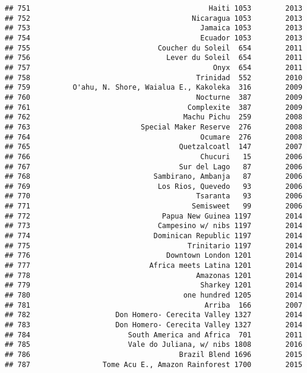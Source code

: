 \documentclass[
]{article}
\begin{document}
\begin{verbatim}
## 751                                          Haiti 1053        2013
## 752                                      Nicaragua 1053        2013
## 753                                        Jamaica 1053        2013
## 754                                        Ecuador 1053        2013
## 755                              Coucher du Soleil  654        2011
## 756                                Lever du Soleil  654        2011
## 757                                           Onyx  654        2011
## 758                                       Trinidad  552        2010
## 759          O'ahu, N. Shore, Waialua E., Kakoleka  316        2009
## 760                                       Nocturne  387        2009
## 761                                     Complexite  387        2009
## 762                                    Machu Pichu  259        2008
## 763                          Special Maker Reserve  276        2008
## 764                                        Ocumare  276        2008
## 765                                   Quetzalcoatl  147        2007
## 766                                        Chucuri   15        2006
## 767                                   Sur del Lago   87        2006
## 768                             Sambirano, Ambanja   87        2006
## 769                              Los Rios, Quevedo   93        2006
## 770                                       Tsaranta   93        2006
## 771                                      Semisweet   99        2006
## 772                               Papua New Guinea 1197        2014
## 773                              Campesino w/ nibs 1197        2014
## 774                             Dominican Republic 1197        2014
## 775                                     Trinitario 1197        2014
## 776                                Downtown London 1201        2014
## 777                            Africa meets Latina 1201        2014
## 778                                       Amazonas 1201        2014
## 779                                        Sharkey 1201        2014
## 780                                    one hundred 1205        2014
## 781                                         Arriba  166        2007
## 782                    Don Homero- Cerecita Valley 1327        2014
## 783                    Don Homero- Cerecita Valley 1327        2014
## 784                       South America and Africa  701        2011
## 785                       Vale do Juliana, w/ nibs 1808        2016
## 786                                   Brazil Blend 1696        2015
## 787                 Tome Acu E., Amazon Rainforest 1700        2015

\end{verbatim}
\end{document}
